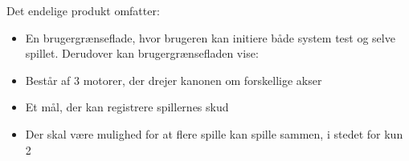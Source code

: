 Det endelige produkt omfatter:
\begin{itemize}
	\item{En brugergrænseflade, hvor brugeren kan initiere både system test og selve spillet. Derudover kan brugergrænsefladen vise:}
	\item{Består af 3 motorer, der drejer kanonen om forskellige akser}
	\item{Et mål, der kan registrere spillernes skud}
	\item {Der skal være mulighed for at flere spille kan spille sammen, i stedet for kun 2}
\end{itemize}


